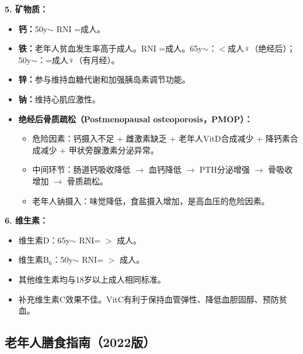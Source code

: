 \begin{keybox}
\textbf{5. 矿物质：}
\begin{itemize}[leftmargin=*]
    \item \textbf{钙：}50y$\sim$ RNI =成人。
    \item \textbf{铁：}老年人贫血发生率高于成人。RNI =成人。65y$\sim$：$<$成人$\female$（绝经后）；50y$\sim$：=成人$\female$（有月经）。
    \item \textbf{锌：}参与维持血糖代谢和加强胰岛素调节功能。
    \item \textbf{钠：}维持心肌应激性。

    \item \textbf{绝经后骨质疏松（Postmenopausal osteoporosis，PMOP）：}
    \begin{itemize}
        \item 危险因素：钙摄入不足 + 雌激素缺乏 + 老年人VitD合成减少 + 降钙素合成减少 + 甲状旁腺激素分泌异常。
        \item 中间环节：肠道钙吸收降低 $\rightarrow$ 血钙降低 $\rightarrow$ PTH分泌增强 $\rightarrow$ 骨吸收增加 $\rightarrow$ 骨质疏松。
        \item 老年人钠摄入：味觉降低，食盐摄入增加，是高血压的危险因素。
    \end{itemize}
\end{itemize}

\textbf{6. 维生素：}
\begin{itemize}[leftmargin=*]
    \item 维生素D：65y$\sim$ RNI= $>$ 成人。
    \item 维生素B$_{6}$：50y$\sim$ RNI= $>$ 成人。
    \item 其他维生素均与18岁以上成人相同标准。
    \item 补充维生素C效果不佳。VitC有利于保持血管弹性、降低血胆固醇、预防贫血。
\end{itemize}
\end{keybox}

\subsection{老年人膳食指南（2022版）}

